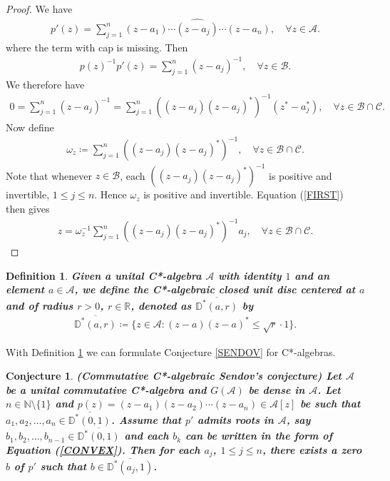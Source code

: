 \documentclass{amsart}
\newtheorem{conjecture}[theorem]{Conjecture}
\newtheorem{definition}[theorem]{Definition}
\begin{document}
\begin{proof}
	We have 
	\begin{align*}
		p'(z)=\sum_{j=1}^{n}(z-a_1)\cdots \widehat{(z-a_j)}\cdots (z-a_n), \quad \forall z \in \mathcal{A}.
	\end{align*}
	where the term with cap is missing. Then 
	\begin{align*}
		p(z)^{-1}	p'(z)=\sum_{j=1}^{n}(z-a_j)^{-1}, \quad \forall z \in \mathcal{B}.
	\end{align*}
We therefore have 
\begin{align}\label{FIRST}
	0=\sum_{j=1}^{n}(z-a_j)^{-1}=\sum_{j=1}^{n}((z-a_j)(z-a_j)^*)^{-1}(z^*-a_j^*), \quad \forall z \in \mathcal{B}\cap  \mathcal{C}.
\end{align}
Now  define 
\begin{align*}
	\omega_z \coloneqq \sum_{j=1}^{n}((z-a_j)(z-a_j)^*)^{-1}, \quad \forall z \in \mathcal{B}\cap  \mathcal{C}.
\end{align*}
Note that whenever $ z \in \mathcal{B}$, each $((z-a_j)(z-a_j)^*)^{-1}$ is positive and invertible, $1\leq j \leq n$. Hence $\omega_z$ is positive and invertible. Equation (\ref{FIRST}) then gives 
\begin{align*}
z=\omega_z^{-1}\sum_{j=1}^{n}((z-a_j)(z-a_j)^*)^{-1}a_j, \quad \forall z \in \mathcal{B}\cap  \mathcal{C}.
\end{align*}
\end{proof}
\begin{definition}\label{CDISC}
	\textbf{Given a unital  C*-algebra $\mathcal{A}$ with identity $1$  and an element $a\in \mathcal{A}$, we define the C*-algebraic closed unit disc centered at $a$ and of radius $r>0$, $r\in \mathbb{R}$, denoted as $\overline{\mathbb{D}^*(a, r)}$  by
	\begin{align*}
	 \overline{\mathbb{D}^*(a, r)}\coloneqq 	\{z\in \mathcal{A}: (z-a)(z-a)^*\leq \sqrt{r}\cdot 1\}.
	\end{align*}}
\end{definition}
With Definition \ref{CDISC} we can formulate Conjecture \ref{SENDOV} for C*-algebras.
\begin{conjecture}\label{CSENDOV} 	\textbf{(Commutative C*-algebraic Sendov's conjecture)
Let $\mathcal{A}$	be a unital commutative C*-algebra and $G(\mathcal{A})$ be  dense in $\mathcal{A}$. 	Let $n \in \mathbb{N}\setminus \{1\}$ and $p(z)=(z-a_1)(z-a_2)\cdots (z-a_n)\in\mathcal{A}[z]$ be such that $a_1, a_2, \dots,  a_n \in \overline{\mathbb{D^*}(0, 1)}$. Assume that $p'$ admits roots in $\mathcal{A}$, say $b_1, b_2, \dots,  b_{n-1} \in \overline{\mathbb{D^*}(0, 1)}$ and each $b_k$ can be written in the form of Equation (\ref{CONVEX}). Then for each $a_j$, $1\leq j\leq n$, there exists  a zero $b$ of $p'$ such that $b \in  \overline{\mathbb{D}^*(a_j, 1)}$.} 	
\end{conjecture}
\end{document}
